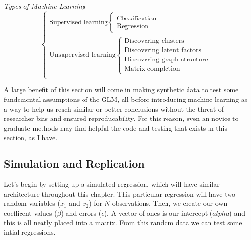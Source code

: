 \documentclass[12pt]{article}\usepackage[]{graphicx}\usepackage[]{color}
\begin{document}
\begin{flushleft}
\

\textit{Types of Machine Learning}
\begin{equation}\nonumber
\begin{cases}
\text{Supervised learning} \begin{cases} \text{Classification} \\ \text{Regression} \end{cases}\\
\text{Unsupervised learning} \begin{cases} \text{Discovering clusters} \\ \text{Discovering latent factors} \\ \text{Discovering graph structure} \\ \text{Matrix completion} \end{cases}\\
\end{cases}
\end{equation}

A large benefit of this section will come in making synthetic data to test some fundemental assumptions of the GLM, all before introducing machine learning as a way to help us reach similar or better conclusions without the threat of researcher bias and ensured reproducability. For this reason, even an novice to graduate methods may find helpful the code and testing that exists in this section, as I have.

\subsection{Simulation and Replication}

Let's begin by setting up a simulated regression, which will have similar architecture throughout this chapter. This particular regression will have two random variables ($x_1$ and $x_2$) for $N$ observations. Then, we create our own coefficent values ($\beta$) and errors ($e$). A vector of ones is our intercept ($alpha$) and this is all neatly placed into a matrix. From this random data we can test some intial regressions.


\end{flushleft}
\end{document}

